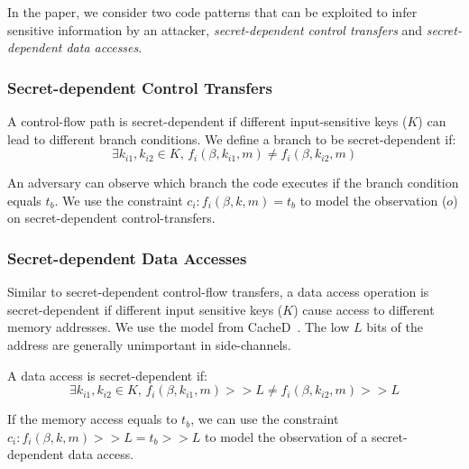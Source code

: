 In the paper, we consider two code patterns that can be exploited to infer sensitive information
 by an attacker,
\emph{secret-dependent control transfers} and \emph{secret-dependent data
accesses}. 

\subsubsection{Secret-dependent Control Transfers}
A control-flow path is secret-dependent if different input-sensitive keys
($K$) can lead to different branch conditions. 
We define a branch to be secret-dependent if:
$$\exists k_{i1}, k_{i2} \in K, \,f_i(\beta, k_{i1}, m) \neq f_i(\beta, k_{i2}, m)$$

An adversary can observe which branch the code executes if the branch condition
equals $t_b$. We use the constraint $c_i : f_i(\beta, k, m) = t_b$ to model
the observation ($o$) on secret-dependent control-transfers.

\subsubsection{Secret-dependent Data Accesses}
Similar to secret-dependent control-flow transfers, a data access operation is
secret-dependent if different input sensitive keys ($K$) cause access to different
memory addresses. We use the model from CacheD~\cite{203878}. The low $L$ bits
of the address are generally unimportant in side-channels.

A data access is secret-dependent if:
$$\exists k_{i1}, k_{i2} \in K, \,f_i(\beta, k_{i1}, m) >> L \neq f_i(\beta, k_{i2}, m) >> L$$

If the memory access equals to $t_b$, we can use the constraint $c_i :
f_i(\beta, k, m) >> L = t_b >> L$ to model the observation of a secret-dependent
data access.

